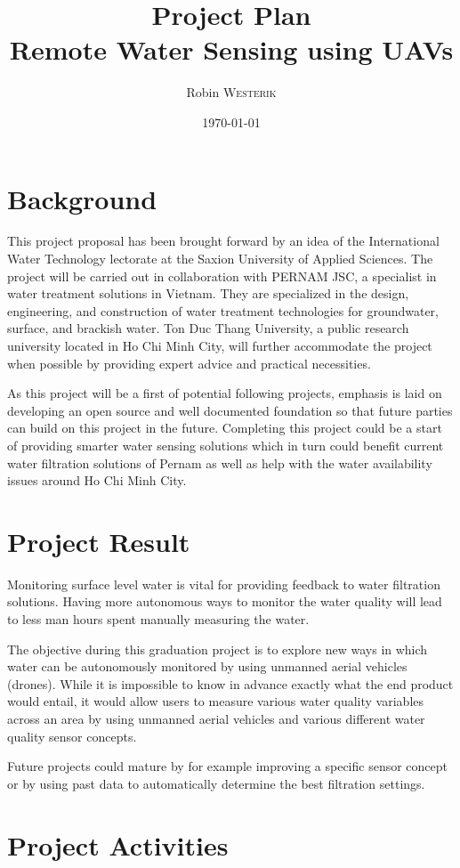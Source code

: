 \documentclass[11pt, a4paper]{article}
\title{Project Plan\\Remote Water Sensing using UAVs}
\author{Robin \textsc{Westerik}}
\date{\today}
\begin{document}


\tableofcontents
\pagebreak

\section{Background}
This project proposal has been brought forward by an idea of the International Water Technology lectorate at the Saxion University of Applied Sciences. The project will be carried out in collaboration with PERNAM JSC, a specialist in water treatment solutions in Vietnam. They are specialized in the design, engineering, and construction of water treatment technologies for groundwater, surface, and brackish water. Ton Duc Thang University, a public research university located in Ho Chi Minh City, will further accommodate the project when possible by providing expert advice and practical necessities. 

As this project will be a first of potential following projects, emphasis is laid on developing an open source and well documented foundation so that future parties can build on this project in the future. Completing this project could be a start of providing smarter water sensing solutions which in turn could benefit current water filtration solutions of Pernam as well as help with the water availability issues around Ho Chi Minh City.

\section{Project Result}
Monitoring surface level water is vital for providing feedback to water filtration solutions. Having more autonomous ways to monitor the water quality will lead to less man hours spent manually measuring the water.

The objective during this graduation project is to explore new ways in which water can be autonomously monitored by using unmanned aerial vehicles (drones). While it is impossible to know in advance exactly what the end product would entail, it would allow users to measure various water quality variables across an area by using unmanned aerial vehicles and various different water quality sensor concepts.

Future projects could mature by for example improving a specific sensor concept or by using past data to automatically determine the best filtration settings.

\section{Project Activities}
\end{document}

